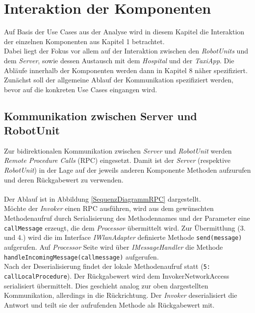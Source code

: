 \section{Interaktion der Komponenten}
Auf Basis der Use Cases aus der Analyse wird in diesem Kapitel die Interaktion der einzelnen Komponenten aus Kapitel 1 betrachtet. \\
Dabei liegt der Fokus vor allem auf der Interaktion zwischen den \emph{RobotUnits} und dem \emph{Server}, sowie dessen Austausch mit dem \emph{Hospital} und der \emph{TaxiApp}. 
Die Abläufe innerhalb der Komponenten werden dann in Kapitel 8 näher spezifiziert. \\
Zunächst soll der allgemeine Ablauf der Kommunikation spezifiziert werden, bevor auf die konkreten Use Cases eingangen wird.

\subsection*{Kommunikation zwischen Server und RobotUnit}
Zur bidirektionalen Kommunikation zwischen \emph{Server} und \emph{RobotUnit} werden \emph{Remote Procedure Calls} (RPC) eingesetzt. Damit ist der \emph{Server} (respektive \emph{RobotUnit}) in der Lage auf der jeweils anderen Komponente Methoden aufzurufen und deren Rückgabewert zu verwenden. \\ \\
Der Ablauf ist in Abbildung \ref{SequenzDiagrammRPC} dargestellt. \\
Möchte der \emph{Invoker} einen RPC ausführen, wird aus dem gewünschten Methodenaufruf durch Serialisierung des Methodennames und der Parameter eine \texttt{callMessage} erzeugt, die dem \emph{Processor} übermittelt wird. Zur Übermittlung (3. und 4.) wird die im Interface \emph{IWlanAdapter} definierte Methode \texttt{send(message)} aufgerufen. Auf \emph{Processor} Seite wird über \emph{IMessageHandler} die Methode \texttt{handleIncomingMessage(callmessage)} aufgerufen. \\
Nach der Deserialisierung findet der lokale Methodenaufruf statt (\texttt{5: callLocalProcedure}). Der Rückgabewert wird dem InvokerNetworkAccess serialisiert übermittelt. Dies geschieht analog zur oben dargestellten Kommunikation, allerdings in die Rückrichtung. Der \emph{Invoker} deserialisiert die Antwort und teilt sie der aufrufenden Methode als Rückgabewert mit.
